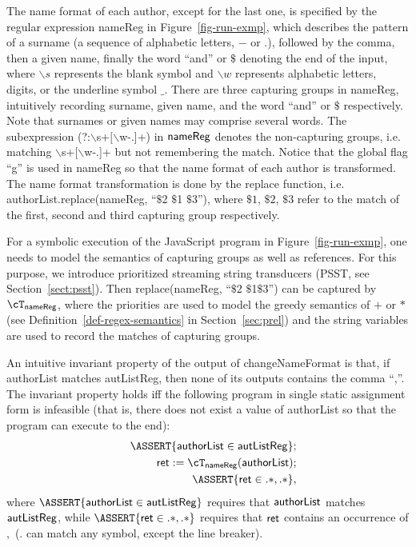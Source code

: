 The name format of each author, except for the last one, is specified by the regular expression {\sf nameReg}  in Figure~\ref{fig-run-exmp}, which describes the pattern of a surname (a sequence of alphabetic letters, $-$ or $.$), followed by the comma, then a given name, finally the word ``and'' or $\$$ denoting the end of the input, where $\backslash s$ represents the blank symbol and $\backslash w$ represents alphabetic letters, digits, or the underline symbol $\_$. There are three capturing groups in {\sf nameReg}, intuitively recording surname, given name, and the word ``and'' or $\$$ respectively. Note that surnames or given names may comprise several words. The subexpression (?:$\backslash$s+$[\backslash$w-.]+) in ${\sf nameReg}$ denotes the non-capturing groups, i.e. matching $\backslash$s+$[\backslash$w-.]+ but not remembering the match.
%
Notice that the global flag ``g'' is used in {\sf nameReg} so that the name format of each author is transformed. 
The name format transformation is done by the {\sf replace} function, i.e. {\sf authorList.replace(nameReg, ``$\$$2 $\$$1 $\$$3'')}, where $\$1$, $\$2$, $\$3$ refer to the match of the first, second and third capturing group respectively. 

For a symbolic execution of the JavaScript program in Figure~\ref{fig-run-exmp}, one needs to  model the semantics of capturing groups as well as references. For this purpose, we introduce prioritized streaming string transducers (PSST, see Section~\ref{sect:psst}). Then {\sf replace(nameReg, ``$\$$2 $\$$1$\$$3'')} can be captured by $\cT_{\sf nameReg}$, where the priorities are used to model the greedy semantics of $+$ or $*$ (see Definition~\ref{def-regex-semantics} in Section~\ref{sec:prel}) and the string variables are used to record the matches of capturing groups.

An intuitive invariant property of the output of {\sf changeNameFormat} is that, if {\sf authorList} matches {\sf autListReg}, then none of its outputs contains the comma ``,''. The invariant property holds iff the following program in single static assignment form is infeasible (that is, there does not exist a value of {\sf authorList} so that the program can execute to the end):
%
\begin{eqnarray}\label{eqn:exmp}
& & \ASSERT{\sf authorList \in autListReg};\nonumber \\
& & \sf ret  := \sf  \cT_{nameReg}(authorList);\nonumber \\
& &  \ASSERT{\sf ret \in .*,.*},
\end{eqnarray}
%
where $\ASSERT{\sf authorList \in autListReg}$ requires that $\sf authorList$ matches $\sf autListReg$, while $\ASSERT{\sf ret \in .*,.*}$ requires that $\sf ret$ contains an occurrence of $,$ ($.$ can match any symbol, except the line breaker).

